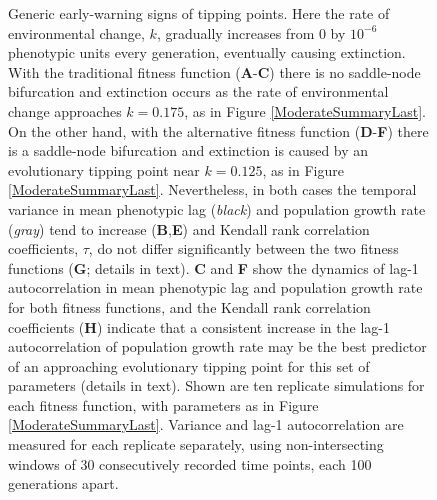 \documentclass[12pt,letterpaper]{article} %
\begin{document}
\begin{figure}[!ht]
\centering
\caption{
Generic early-warning signs of tipping points.
Here the rate of environmental change, $k$, gradually increases from 0 by $10^{-6}$ phenotypic units every generation, eventually causing extinction.
With the traditional fitness function (\textbf{A}-\textbf{C}) there is no saddle-node bifurcation and extinction occurs as the rate of environmental change approaches $k=0.175$, as in Figure \ref{ModerateSummaryLast}.
On the other hand, with the alternative fitness function (\textbf{D}-\textbf{F}) there is a saddle-node bifurcation and extinction is caused by an evolutionary tipping point near $k = 0.125$, as in Figure \ref{ModerateSummaryLast}.
Nevertheless, in both cases the temporal variance in mean phenotypic lag (\textit{black}) and population growth rate (\textit{gray}) tend to increase (\textbf{B},\textbf{E}) and Kendall rank correlation coefficients, $\tau$, do not differ significantly between the two fitness functions (\textbf{G}; details in text).
\textbf{C} and \textbf{F} show the dynamics of lag-1 autocorrelation in mean phenotypic lag and population growth rate for both fitness functions, and the Kendall rank correlation coefficients (\textbf{H}) indicate that a consistent increase in the lag-1 autocorrelation of population growth rate may be the best predictor of an approaching evolutionary tipping point for this set of parameters (details in text).
Shown are ten replicate simulations for each fitness function, with parameters as in Figure \ref{ModerateSummaryLast}.
Variance and lag-1 autocorrelation are measured for each replicate separately, using non-intersecting windows of 30 consecutively recorded time points, each 100 generations apart.
}
\label{ModerateWarnings}
\end{figure}
\end{document}
